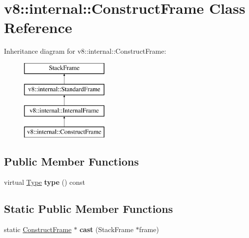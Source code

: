 \hypertarget{classv8_1_1internal_1_1_construct_frame}{}\section{v8\+:\+:internal\+:\+:Construct\+Frame Class Reference}
\label{classv8_1_1internal_1_1_construct_frame}
Inheritance diagram for v8\+:\+:internal\+:\+:Construct\+Frame\+:\begin{figure}[H]
\begin{center}
\leavevmode
\includegraphics[height=4.000000cm]{classv8_1_1internal_1_1_construct_frame}
\end{center}
\end{figure}
\subsection*{Public Member Functions}
\begin{DoxyCompactItemize}
\item 
\hypertarget{classv8_1_1internal_1_1_construct_frame_a9fd1ef50d85581aa8fad921a26d3efdd}{}virtual \hyperlink{classv8_1_1internal_1_1_type_impl}{Type} {\bfseries type} () const \label{classv8_1_1internal_1_1_construct_frame_a9fd1ef50d85581aa8fad921a26d3efdd}

\end{DoxyCompactItemize}
\subsection*{Static Public Member Functions}
\begin{DoxyCompactItemize}
\item 
\hypertarget{classv8_1_1internal_1_1_construct_frame_a605f22c838c4e877e620d070898d219c}{}static \hyperlink{classv8_1_1internal_1_1_construct_frame}{Construct\+Frame} $\ast$ {\bfseries cast} (Stack\+Frame $\ast$frame)\label{classv8_1_1internal_1_1_construct_frame_a605f22c838c4e877e620d070898d219c}

\end{DoxyCompactItemize}
